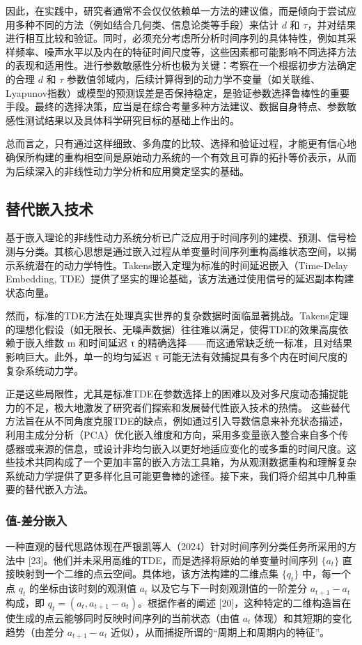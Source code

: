 因此，在实践中，研究者通常不会仅仅依赖单一方法的建议值，而是倾向于尝试应用多种不同的方法（例如结合几何类、信息论类等手段）来估计 $d$ 和 $\tau$，并对结果进行相互比较和验证。同时，必须充分考虑所分析时间序列的具体特性，例如其采样频率、噪声水平以及内在的特征时间尺度等，这些因素都可能影响不同选择方法的表现和适用性。进行参数敏感性分析也极为关键：考察在一个根据初步方法确定的合理 $d$ 和 $\tau$ 参数值邻域内，后续计算得到的动力学不变量（如关联维、Lyapunov指数）或模型的预测误差是否保持稳定，是验证参数选择鲁棒性的重要手段。最终的选择决策，应当是在综合考量多种方法建议、数据自身特点、参数敏感性测试结果以及具体科学研究目标的基础上作出的。

总而言之，只有通过这样细致、多角度的比较、选择和验证过程，才能更有信心地确保所构建的重构相空间是原始动力系统的一个有效且可靠的拓扑等价表示，从而为后续深入的非线性动力学分析和应用奠定坚实的基础。



\subsection{替代嵌入技术}
基于嵌入理论的非线性动力系统分析已广泛应用于时间序列的建模、预测、信号检测与分类。其核心思想是通过嵌入过程从单变量时间序列重构高维状态空间，以揭示系统潜在的动力学特性。Takens嵌入定理为标准的时间延迟嵌入（Time-Delay Embedding, TDE）提供了坚实的理论基础，该方法通过使用信号的延迟副本构建状态向量。

然而，标准的TDE方法在处理真实世界的复杂数据时面临显著挑战。Takens定理的理想化假设（如无限长、无噪声数据）往往难以满足，使得TDE的效果高度依赖于嵌入维数 m 和时间延迟 τ 的精确选择——而这通常缺乏统一标准，且对结果影响巨大。此外，单一的均匀延迟 τ 可能无法有效捕捉具有多个内在时间尺度的复杂系统动力学。

正是这些局限性，尤其是标准TDE在参数选择上的困难以及对多尺度动态捕捉能力的不足，极大地激发了研究者们探索和发展替代性嵌入技术的热情。 这些替代方法旨在从不同角度克服TDE的缺点，例如通过引入导数信息来补充状态描述，利用主成分分析（PCA）优化嵌入维度和方向，采用多变量嵌入整合来自多个传感器或来源的信息，或设计非均匀嵌入以更好地适应变化的或多重的时间尺度。这些技术共同构成了一个更加丰富的嵌入方法工具箱，为从观测数据重构和理解复杂系统动力学提供了更多样化且可能更鲁棒的途径。接下来，我们将介绍其中几种重要的替代嵌入方法。
\subsubsection{值-差分嵌入}
一种直观的替代思路体现在严银凯等人（2024）针对时间序列分类任务所采用的方法中 [23]。他们并未采用高维的TDE，而是选择将原始的单变量时间序列 $\{a_t\}$ 直接映射到一个二维的点云空间。具体地，该方法构建的二维点集 $\{q_t\}$ 中，每一个点 $q_t$ 的坐标由该时刻的观测值 $a_t$ 以及它与下一时刻观测值的一阶差分 $a_{t+1}-a_t$ 构成，即 $q_t = (a_t, a_{t+1}-a_t)$。根据作者的阐述 [20]，这种特定的二维构造旨在使生成的点云能够同时反映时间序列的当前状态（由值 $a_t$ 体现）和其短期的变化趋势（由差分 $a_{t+1}-a_t$ 近似），从而捕捉所谓的“周期上和周期内的特征”。


